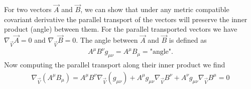 \documentclass[10pt]{article}
\begin{document}
%                    
%                    
%                    
%                                        
    
       For two vectors $\vec A$ and $\vec B$, we can show that under any metric compatible covariant derivative the parallel transport of the vectors will preserve the inner product (angle)  between them. For the parallel transported vectors we have  $\nabla_{\vec V} \vec A = 0$ and $\nabla_{\vec V} \vec B=0$. The angle between $\vec A$ and $\vec B$ is defined as 
    \begin{align}
	A^\mu B^\nu g_{\mu \nu} = A^\mu B_\mu = \text{"angle"}.  
	\end{align}
	Now computing the parallel transport along their inner product we find 
\begin{align}
	\nabla_{\vec V} \left( A^\mu B_\mu \right) = A^\mu B^\nu \nabla_{\vec V} (g_{\mu \nu}) + A^\mu g_{\mu \nu} \nabla_{\vec V} B^\nu + A^\nu g_{\mu \nu} \nabla_{\vec V} B^\mu =0
    \end{align}
\end{document}
